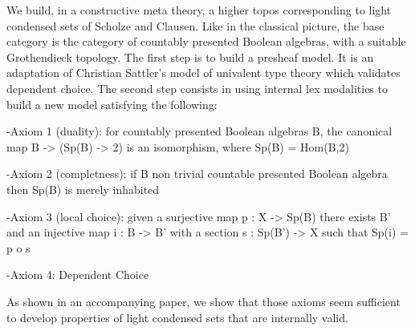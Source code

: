 
We build, in a constructive meta theory, a higher topos corresponding to light condensed sets
of Scholze and Clausen.
Like in the classical picture, the base category is the category of countably presented Boolean
algebras, with a suitable Grothendieck topology.
The first step is to build a presheaf model. It is an adaptation of Christian Sattler's model
of univalent type theory which validates dependent choice. The second step consists in using
internal lex modalities to build a new model satisfying the following:

-Axiom 1 (duality): for countably presented Boolean algebras B, the canonical map B -> (Sp(B) -> 2)
is an isomorphism, where Sp(B) = Hom(B,2)

-Axiom 2 (completness): if B non trivial countable presented Boolean algebra then Sp(B) is merely inhabited

-Axiom 3 (local choice): given a surjective map p : X -> Sp(B) there exists B' and an injective map
i : B -> B' with a section s : Sp(B') -> X such that Sp(i) = p o s

-Axiom 4: Dependent Choice

As shown in an accompanying paper, we show that those axioms seem sufficient to develop 
properties of light condensed sets that are internally valid.

